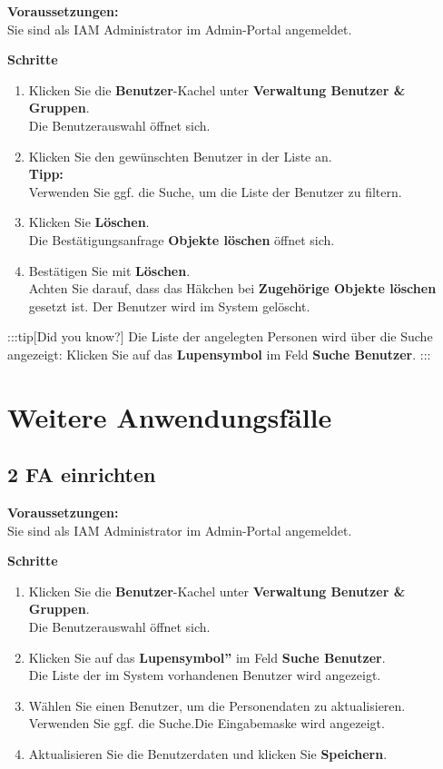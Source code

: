 \documentclass[
  letterpaper,
  DIV=11,
  numbers=noendperiod]{scrreprt}
\providecommand{\tightlist}{%
  \setlength{\itemsep}{0pt}\setlength{\parskip}{0pt}}\usepackage{longtable,booktabs,array}
\begin{document}
\textbf{Voraussetzungen:}\\
Sie sind als IAM Administrator im Admin-Portal angemeldet.

\textbf{Schritte}

\begin{enumerate}
\def\labelenumi{\arabic{enumi}.}
\item
  Klicken Sie die \textbf{Benutzer}-Kachel unter \textbf{Verwaltung
  Benutzer \& Gruppen}.\\
  Die Benutzerauswahl öffnet sich.
\item
  Klicken Sie den gewünschten Benutzer in der Liste an.\\
  \textbf{Tipp:}\\
  Verwenden Sie ggf. die Suche, um die Liste der Benutzer zu filtern.
\item
  Klicken Sie \textbf{Löschen}.\\
  Die Bestätigungsanfrage \textbf{Objekte löschen} öffnet sich.
\item
  Bestätigen Sie mit \textbf{Löschen}.\\
  Achten Sie darauf, dass das Häkchen bei \textbf{Zugehörige Objekte
  löschen} gesetzt ist. Der Benutzer wird im System gelöscht.
\end{enumerate}

:::tip{[}Did you know?{]} Die Liste der angelegten Personen wird über
die Suche angezeigt: Klicken Sie auf das \textbf{Lupensymbol} im Feld
\textbf{Suche Benutzer}. :::

\section{Weitere Anwendungsfälle}\label{weitere-anwendungsfuxe4lle}

\subsection{2 FA einrichten}\label{fa-einrichten}

\textbf{Voraussetzungen:}\\
Sie sind als IAM Administrator im Admin-Portal angemeldet.

\textbf{Schritte}

\begin{enumerate}
\def\labelenumi{\arabic{enumi}.}
\tightlist
\item
  Klicken Sie die \textbf{Benutzer}-Kachel unter \textbf{Verwaltung
  Benutzer \& Gruppen}.\\
  Die Benutzerauswahl öffnet sich.\\
\item
  Klicken Sie auf das \textbf{Lupensymbol''} im Feld \textbf{Suche
  Benutzer}.\\
  Die Liste der im System vorhandenen Benutzer wird angezeigt.\\
\item
  Wählen Sie einen Benutzer, um die Personendaten zu aktualisieren.
  Verwenden Sie ggf. die Suche.Die Eingabemaske wird angezeigt.\\
\item
  Aktualisieren Sie die Benutzerdaten und klicken Sie
  \textbf{Speichern}.
\end{enumerate}
\end{document}
